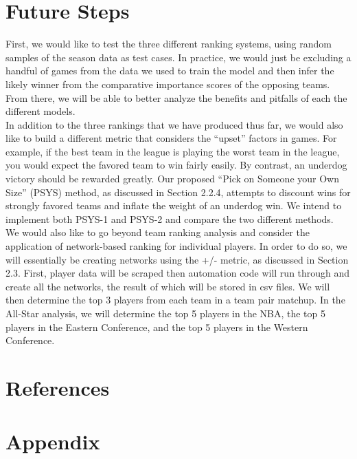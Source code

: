 \documentclass[12pt]{article}%
\begin{document}
\section{Future Steps}
\null\quad\quad First, we would like to test the three different ranking systems, using random samples of the season data as test cases. In practice, we would just be excluding a handful of games from the data we used to train the model and then infer the likely winner from the comparative importance scores of the opposing teams. From there, we will be able to better analyze the benefits and pitfalls of each the different models.\\
\null\quad\quad In addition to the three rankings that we have produced thus far, we would also like to build a different metric that considers the ``upset'' factors in games. For example, if the best team in the league is playing the worst team in the league, you would expect the favored team to win fairly easily. By contrast, an underdog victory should be rewarded greatly. Our proposed ``Pick on Someone your Own Size'' (PSYS) method, as discussed in Section 2.2.4, attempts to discount wins for strongly favored teams and inflate the weight of an underdog win. We intend to implement both PSYS-1 and PSYS-2 and compare the two different methods.\\
\null\quad\quad We would also like to go beyond team ranking analysis and consider the application of network-based ranking for individual players. In order to do so, we will essentially be creating networks using the +/- metric, as discussed in Section 2.3. First, player data will be scraped then automation code will run through and create all the networks, the result of which will be stored in csv files. We will then determine the top 3 players from each team in a team pair matchup. In the All-Star analysis, we will determine the top 5 players in the NBA, the top 5 players in the Eastern Conference, and the top 5 players in the Western Conference.

\section{References}
\printbibliography[heading=none]
\newpage
\section{Appendix}
\end{document}
